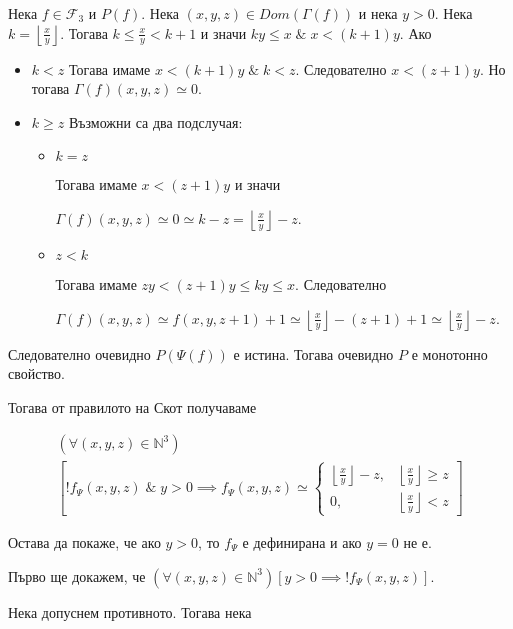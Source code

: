\documentclass{article}
\begin{document}
Нека \(f \in \mathcal{F}_3\) и \(P(f)\). Нека \((x, y, z) \in Dom(\Gamma(f))\) и нека \(y > 0\).
Нека \(k = \displaystyle\left\lfloor\frac{x}{y}\right\rfloor\).
Тогава \(k \leq \displaystyle\frac{x}{y} < k + 1\) и значи
\(ky \leq x \; \& \; x < (k + 1)y\).
Ако
\begin{itemize}
\item \(k < z\)
Тогава имаме \(x < (k + 1)y \; \& \; k < z\).
Следователно \(x < (z + 1)y\).
Но тогава \(\Gamma(f)(x, y, z) \simeq 0\).

\item \(k \geq z\)
Възможни са два подслучая:

\begin{itemize}
\item \(k = z\)

Тогава имаме \(x < (z + 1)y\) и значи

\(\Gamma(f)(x, y, z) \simeq 0 \simeq k - z = \displaystyle\left\lfloor\frac{x}{y}\right\rfloor - z\).
\item \(z < k\)

Тогава имаме \(zy < (z + 1)y \leq ky \leq x\). Следователно

\(\Gamma(f)(x, y, z) \simeq f(x, y, z + 1) + 1 \simeq \displaystyle\left\lfloor\frac{x}{y}\right\rfloor - (z + 1) + 1 \simeq \displaystyle\left\lfloor\frac{x}{y}\right\rfloor - z\).
\end{itemize}
\end{itemize}
Следователно очевидно \(P(\Psi(f))\) е истина.
Тогава очевидно \(P\) е монотонно свойство.

Тогава от правилото на Скот получаваме

\begin{align*}
(\forall (x, y, z) \in \mathbb{N}^3)\\
\left[!f_\Psi(x, y, z) \; \& \; y > 0 \implies f_\Psi(x, y, z) \simeq \begin{cases}
    \displaystyle\left\lfloor\frac{x}{y}\right\rfloor - z, &  \displaystyle\left\lfloor\frac{x}{y}\right\rfloor \geq z \\
    0, & \displaystyle\left\lfloor\frac{x}{y}\right\rfloor < z
\end{cases}\right]
\end{align*}

Остава да покаже, че ако \(y > 0\), то \(f_\Psi\) е дефинирана и ако \(y = 0\) не е.

Първо ще докажем, че \((\forall (x, y, z) \in \mathbb{N}^3)[y > 0 \implies !f_\Psi(x, y, z)]\).

Нека допуснем противното. Тогава нека
\end{document}
